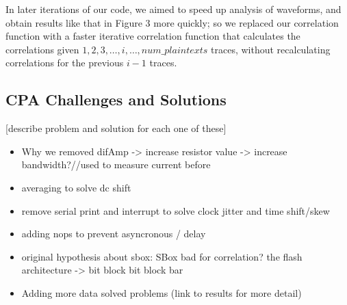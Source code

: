 \documentclass[journal]{ieee_style}
\begin{document}
 In later iterations of our code, we aimed to speed up analysis of waveforms, and obtain results like that in Figure 3 more quickly; so we replaced our correlation function with a faster iterative correlation function that calculates the correlations given $1,2,3,\ldots, i, \ldots, num\_plaintexts$ traces, without recalculating correlations for the previous $i-1$ traces.

\subsection{CPA Challenges and Solutions}
[describe problem and solution for each one of these]
\begin{itemize}
\item Why we removed difAmp -> increase resistor value -> increase bandwidth?//used to measure current before
\item averaging to solve dc shift
\item remove serial print and interrupt to solve clock jitter and time shift/skew
\item adding nops to prevent asyncronous / delay
\item original hypothesis about sbox:  SBox bad for correlation? the flash architecture -> bit block bit block bar
\item Adding more data solved problems (link to  results for more detail)
\end{itemize}
\end{document}
